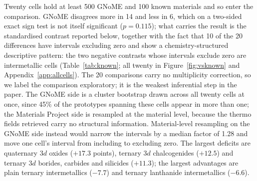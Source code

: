 \documentclass[11pt]{article}
\begin{document}
Twenty cells hold at least 500 GNoME and 100 known materials and so enter the
comparison. GNoME disagrees more in 14 and less in 6, which on a two-sided exact sign test is not
itself significant ($p=0.115$); what carries the result is the standardised contrast reported below, together with
the fact that 10 of the 20 differences have intervals excluding zero and show a
chemistry-structured descriptive pattern:
the two negative contrasts whose intervals exclude zero are intermetallic cells
(Table~\ref{tab:known}; all twenty in Figure~\ref{fig:vsknown} and
Appendix~\ref{app:allcells}). The 20 comparisons carry no multiplicity correction, so we
label the comparison exploratory; it is the weakest inferential step in the paper. The
GNoME side is a cluster bootstrap drawn across all twenty cells at once, since 45\% of
the prototypes spanning these cells appear in more than one; the Materials Project side
is resampled at the material level, because the thermo fields retrieved carry no
structural information. Material-level resampling on the GNoME side instead would narrow
the intervals by a median factor of 1.28 and move one cell's interval from including
to excluding zero. The largest deficits are quaternary 3$d$
oxides ($+17.3$ points), ternary 3$d$ chalcogenides ($+12.5$) and ternary 3$d$ borides,
carbides and silicides ($+11.3$); the largest advantages are plain ternary
intermetallics ($-7.7$) and ternary lanthanide intermetallics ($-6.6$).
\end{document}
